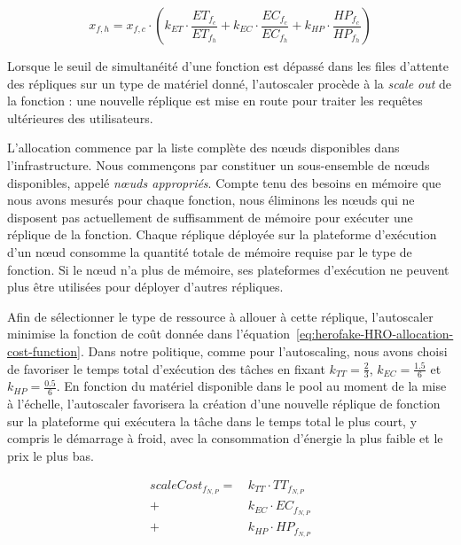 \begin{equation}
    x_{f, h} = x_{f, c} \cdot (k_{ET} \cdot \frac{ET_{{f}_{c}}}{ET_{{f}_{h}}} + k_{EC} \cdot \frac{EC_{{f}_{c}}}{EC_{{f}_{h}}} + k_{HP} \cdot \frac{HP_{{f}_{c}}}{HP_{{f}_{h}}})
\label{eq:herofake-HRO-concurrency-target}
\end{equation}

Lorsque le seuil de simultanéité d'une fonction est dépassé dans les files d'attente des répliques sur un type de matériel donné, l'autoscaler procède à la \textit{scale out} de la fonction : une nouvelle réplique est mise en route pour traiter les requêtes ultérieures des utilisateurs.

L'allocation commence par la liste complète des nœuds disponibles dans l'infrastructure. Nous commençons par constituer un sous-ensemble de nœuds disponibles, appelé \textit{nœuds appropriés}. Compte tenu des besoins en mémoire que nous avons mesurés pour chaque fonction, nous éliminons les nœuds qui ne disposent pas actuellement de suffisamment de mémoire pour exécuter une réplique de la fonction. Chaque réplique déployée sur la plateforme d'exécution d'un nœud consomme la quantité totale de mémoire requise par le type de fonction. Si le nœud n'a plus de mémoire, ses plateformes d'exécution ne peuvent plus être utilisées pour déployer d'autres répliques.

Afin de sélectionner le type de ressource à allouer à cette réplique, l'autoscaler minimise la fonction de coût donnée dans l'équation~\ref{eq:herofake-HRO-allocation-cost-function}. 
Dans notre politique, comme pour l'autoscaling, nous avons choisi de favoriser le temps total d'exécution des tâches en fixant $k_{TT} = \frac{2}{3}$, $k_{EC} = \frac{1.5}{6}$ et $k_{HP} = \frac{0.5}{6}$. 
En fonction du matériel disponible dans le pool au moment de la mise à l'échelle, l'autoscaler favorisera la création d'une nouvelle réplique de fonction sur la plateforme qui exécutera la tâche dans le temps total le plus court, y compris le démarrage à froid, avec la consommation d'énergie la plus faible et le prix le plus bas.

\begin{equation}
\begin{split}
    scaleCost_{{f}_{N, P}} = \, &k_{TT} \cdot {TT}_{{f}_{N, P}} \\
    + &k_{EC} \cdot {EC}_{{f}_{N, P}} \\
    + &k_{HP} \cdot {HP}_{{f}_{N, P}}
\end{split}
\label{eq:herofake-HRO-allocation-cost-function}
\end{equation}

